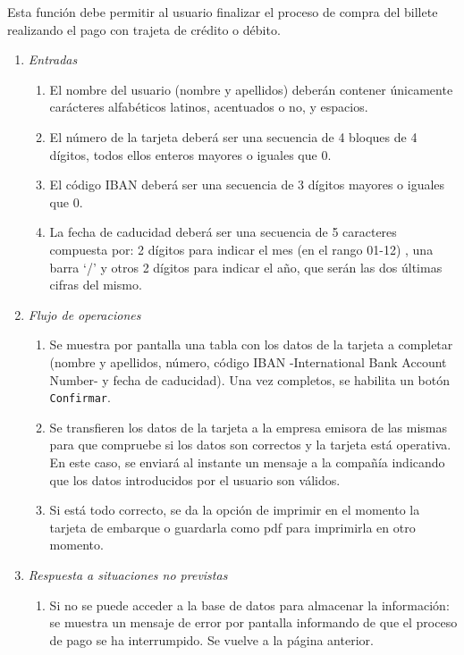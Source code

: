  \label{fun:pagotarjeta}
	Esta función debe permitir al usuario finalizar el proceso de compra del billete realizando el pago con trajeta de crédito o débito.

\begin{enumerate}
	\item \textit{Entradas}
	\begin{enumerate}
		\item El nombre del usuario (nombre y apellidos) deberán contener únicamente carácteres alfabéticos latinos, acentuados o no, y espacios.
		\item El número de la tarjeta deberá ser una secuencia de 4 bloques de 4 dígitos, todos ellos enteros mayores o iguales que 0.
		\item El código IBAN deberá ser una secuencia de 3 dígitos mayores o iguales que 0.
		\item La fecha de caducidad deberá ser una secuencia de 5 caracteres compuesta por: 2 dígitos para indicar el mes (en el rango 01-12) , una barra `/'  y otros 2 dígitos para indicar el año, que serán las dos últimas cifras del mismo.
	\end{enumerate}
	\item \textit{Flujo de operaciones}
	\begin{enumerate}
		\item Se muestra por pantalla una tabla con los datos de la tarjeta a completar (nombre y apellidos, número, código IBAN -International Bank Account Number- y fecha de caducidad). Una vez completos, se habilita un botón \verb|Confirmar|.
		\item Se transfieren los datos de la tarjeta a la empresa emisora de las mismas para que compruebe si los datos son correctos y la tarjeta está operativa. En este caso, se enviará al instante un mensaje a la compañía indicando que los datos introducidos por el usuario son válidos.
		\item Si está todo correcto, se da la opción de imprimir en el momento la tarjeta de embarque o guardarla como pdf para imprimirla en otro momento.
	\end{enumerate}
	\item \textit{Respuesta a situaciones no previstas}
	\begin{enumerate}
		\item Si no se puede acceder a la base de datos para almacenar la información: se muestra un mensaje de error por pantalla informando de que el proceso de pago se ha interrumpido. Se vuelve a la página anterior.

\end{enumerate}
\end{enumerate}
